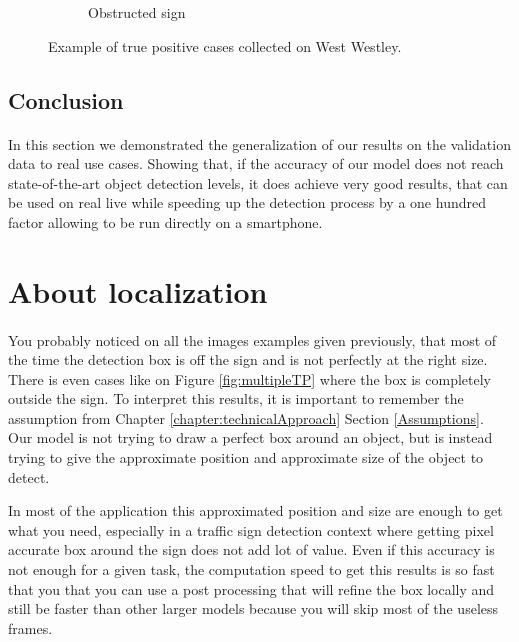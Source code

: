 \begin{figure}
\begin{center}
\begin{subfigure}[t]{.49\linewidth}
      \caption{Obstructed sign}
      \label{fig:wwObs3TP}
    \end{subfigure}
    \caption{Example of true positive cases collected on West Westley.}
    \label{fig:wwTPcases}
  \end{center}
\end{figure}

\subsection{Conclusion}
\paragraph{}
In this section we demonstrated the generalization of our results on the validation data to real use cases. Showing that, if the accuracy of our model does not reach state-of-the-art object detection levels, it does achieve very good results, that can be used on real live while speeding up the detection process by a one hundred factor allowing to be run directly on a smartphone.

\section{About localization}
\paragraph{}
You probably noticed on all the images examples given previously, that most of the time the detection box is off the sign and is not perfectly at the right size. There is even cases like on Figure \ref{fig:multipleTP} where the box is completely outside the sign. To interpret this results, it is important to remember the assumption from Chapter \ref{chapter:technicalApproach} Section \ref{Assumptions}. Our model is not trying to draw a perfect box around an object, but is instead trying to give the approximate position and approximate size of the object to detect. 

In most of the application this approximated position and size are enough to get what you need, especially in a traffic sign detection context where getting pixel accurate box around the sign does not add lot of value. Even if this accuracy is not enough for a given task, the computation speed to get this results is so fast that you that you can use a post processing that will refine the box locally and still be faster than other larger models because you will skip most of the useless frames.

